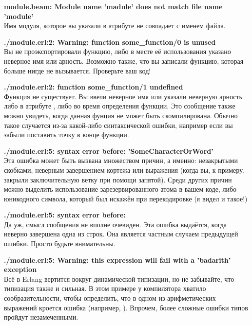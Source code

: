 \blankline
\begin{minipage}{\textwidth}
\textbf{module.beam: Module name 'madule' does not match file name 'module'}\\
Имя модуля, которое вы указали в атрибуте  не совпадает с именем файла.
\end{minipage}

\blankline
\begin{minipage}{\textwidth}
\textbf{./module.erl:2: Warning: function some\_function/0 is unused}\\ 
Вы не проэкспортировали функцию, либо в месте её использования указано неверное имя или арность.
Возможно также, что вы записали функцию, которая больше нигде не вызывается.
Проверьте ваш код!
\end{minipage}

\blankline
\begin{minipage}{\textwidth}
\textbf{./module.erl:2: function some\_function/1 undefined}\\ 
Функция не существует.
Вы ввели неверное имя или указали неверную арность либо в атрибуте , либо во время определения функции.
Это сообщение также можно увидеть, когда данная фунция не может быть скомпилирована.
Обычно такое случается из\--за какой\--либо синтаксической ошибки, например если вы забыли поставить точку в конце функции.
\end{minipage}

\blankline
\begin{minipage}{\textwidth}
\textbf{./module.erl:5: syntax error before: 'SomeCharacterOrWord'}\\ 
Эта ошибка может быть вызвана множеством причин, а именно: незакрытыми скобками, неверным завершением кортежа или выражения (когда вы, к примеру, закрыли заключительную ветку  при помощи запятой).
Среди других причин можно выделить использование зарезервированного атома в вашем коде, либо юникодного символа, который был искажён при перекодировке (я видел и такое!)
\end{minipage}

\blankline
\begin{minipage}{\textwidth}
\textbf{./module.erl:5: syntax error before: }\\ 
Да уж, смысл сообщения не вполне очевиден.
Эта ошибка выдаётся, когда неверно завершена одна из строк.
Она является частным случаем предыдущей ошибки.
Просто будьте внимательны.
\end{minipage}

\blankline
\begin{minipage}{\textwidth}
\textbf{./module.erl:5: Warning: this expression will fail with a 'badarith' exception}\\
Всё в Erlang вертится вокруг динамической типизации, но не забывайте, что типизация также и сильная.
В этом примере у компилятора хватило сообразительности, чтобы определить, что в одном из арифметических выражений кроется ошибка (например, ).
Впрочем, более сложные ошибки типов пройдут незамеченными.
\end{minipage}

